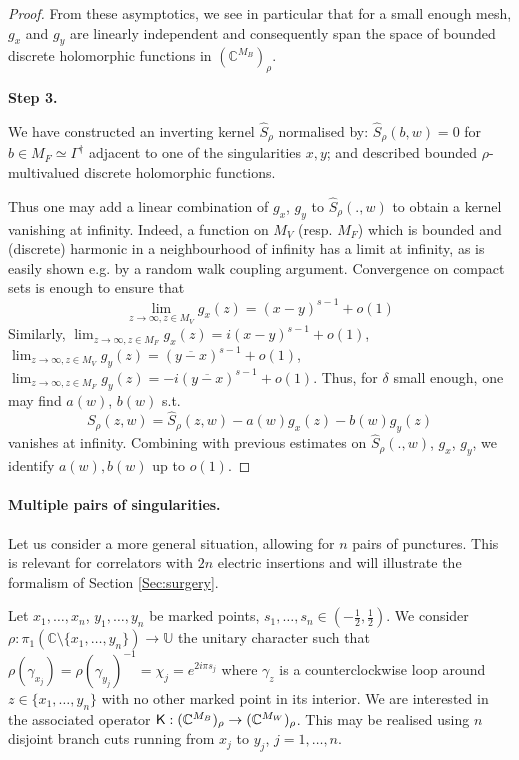 \documentclass[10pt]{article}
\newcommand{\C}{\mathbb{C}}
\newcommand{\U}{\mathbb{U}}
\newcommand{\rK}{{\sf K}}
\newcommand{\dg}{\dagger}
\begin{document}
\begin{proof}
From these asymptotics, we see in particular that for a small enough mesh, $g_x$ and $g_y$ are linearly independent and consequently span the space of bounded discrete holomorphic functions in $(\C^{M_B})_\rho$.


{\bf Step 3.}

We have constructed an inverting kernel $\hat S_\rho$ normalised by: $\hat S_\rho(b,w)=0$ for $b\in M_F\simeq\Gamma^\dg$ adjacent to one of the singularities $x,y$; and described bounded $\rho$-multivalued discrete holomorphic functions.

Thus one may add a linear combination of $g_x$, $g_y$ to $\hat S_\rho(.,w)$ to obtain a kernel vanishing at infinity. Indeed, a function on $M_V$ (resp. $M_F$) which is bounded and (discrete) harmonic in a neighbourhood of infinity has a limit at infinity, as is easily shown e.g. by a random walk coupling argument. Convergence on compact sets is enough to ensure that
$$\lim_{z\rightarrow\infty,z\in M_V} g_x(z)=(x-y)^{s-1}+o(1)$$
Similarly, $\lim_{z\rightarrow\infty,z\in M_F} g_x(z)=i(x-y)^{s-1}+o(1)$, $\lim_{z\rightarrow\infty,z\in M_V} g_y(z)=(\overline{y-x})^{s-1}+o(1)$, $\lim_{z\rightarrow\infty,z\in M_F} g_y(z)=-i(\overline{y-x})^{s-1}+o(1)$. 
Thus, for $\delta$ small enough, one may find $a(w)$, $b(w)$ s.t. 
$$S_\rho(z,w)=\hat S_\rho(z,w)-a(w)g_x(z)-b(w)g_y(z)$$
vanishes at infinity. Combining with previous estimates on $\hat S_\rho(.,w)$, $g_x$, $g_y$, we identify $a(w),b(w)$ up to $o(1)$.
\end{proof}

\paragraph{Multiple pairs of singularities.\\}

Let us consider a more general situation, allowing for $n$ pairs of punctures. This is relevant for correlators with $2n$ electric insertions and will illustrate the formalism of Section \ref{Sec:surgery}.

Let $x_1,\dots,x_n$, $y_1,\dots,y_n$ be marked points, $s_1,\dots,s_n\in (-\frac 12,\frac 12)$. We consider $\rho:\pi_1(\C\setminus\{x_1,\dots,y_n\})\rightarrow\U$ the unitary character such that $\rho(\gamma_{x_j})=\rho(\gamma_{y_j})^{-1}=\chi_j=e^{2i\pi s_j}$ where $\gamma_{z}$ is a counterclockwise loop around $z\in\{x_1,\dots,y_n\}$ with no other marked point in its interior. We are interested in the associated operator $\rK:(\C^{M_B})_\rho\rightarrow (\C^{M_W})_\rho$. This may be realised using $n$ disjoint branch cuts running from $x_j$ to $y_j$, $j=1,\dots,n$.
\end{document}
